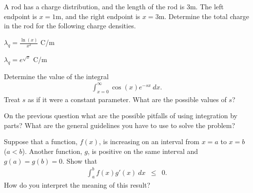\begin{problem}
\item A rod has a charge distribution, and the length of the rod is
  3m. The left endpoint is $x=1$m, and the right endpoint is
  $x=3$m. Determine the total charge in the rod for the following
  charge densities.
  \begin{subproblem}
    \item $\lambda_q = \frac{\ln(x)}{x^2} $ C/m
      \vfill
    \item $\lambda_q = e^{\sqrt{x}}$ C/m
      \vfill
  \end{subproblem}
  \clearpage
  \item  Determine the value of the integral
  \begin{eqnarray*}
    \int_{x=0}^\infty \cos(x) e^{-sx} ~ dx.
  \end{eqnarray*}
  Treat $s$ as if it were a constant parameter. What are the possible values of $s$?
  \vfill
  \clearpage
  \item On the previous question what are the possible pitfalls of using integration by parts?
  What are the general guidelines you have to use to solve the problem?
    \vspace{6em}

  \item Suppose that a function, $f(x)$, is increasing on an interval from $x=a$ to $x=b$ ($a<b$).
  Another function, $g$, is positive on the same interval and $g(a)=g(b)=0$. Show that
  \begin{eqnarray*}
    \int^b_a f(x) g'(x) ~ dx & \leq & 0.
  \end{eqnarray*}
  How do you interpret the meaning of this result?

  \vfill

\end{problem}

\postClass

